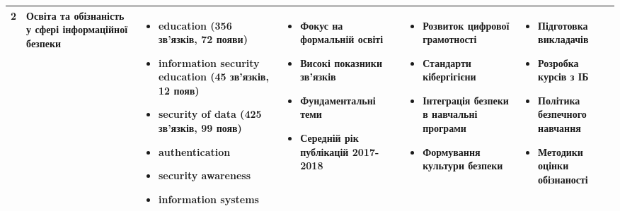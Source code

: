 \documentclass[12pt,a4paper,landscape]{article}
\begin{document}
\begin{longtable}{|p{1cm}|p{3.5cm}|p{5cm}|p{4cm}|p{4cm}|p{5cm}|}
\cellcolor{green!20}2 & 
\textbf{Освіта та обізнаність у сфері інформаційної безпеки} & 
\begin{itemize}
    \item education (356 зв'язків, 72 появи)
    \item information security education (45 зв'язків, 12 появ)
    \item security of data (425 зв'язків, 99 появ)
    \item authentication
    \item security awareness
    \item information systems
\end{itemize} & 
\begin{itemize}
    \item Фокус на формальній освіті
    \item Високі показники зв'язків
    \item Фундаментальні теми
    \item Середній рік публікацій 2017-2018
\end{itemize} & 
\begin{itemize}
    \item Розвиток цифрової грамотності
    \item Стандарти кібергігієни
    \item Інтеграція безпеки в навчальні програми
    \item Формування культури безпеки
\end{itemize} & 
\begin{itemize}
    \item Підготовка викладачів
    \item Розробка курсів з ІБ
    \item Політика безпечного навчання
    \item Методики оцінки обізнаності
\end{itemize} \\
\hline


\end{longtable}
\end{document}
